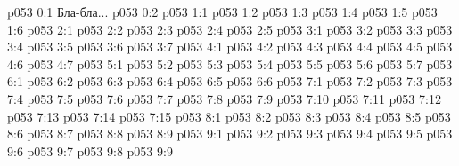 \author{Мановандет Мелхиседек}
\vs p053 0:1  Бла-бла...
\vs p053 0:2 
\vs p053 1:1 
\vs p053 1:2 
\vs p053 1:3 
\vs p053 1:4 
\vs p053 1:5 
\vs p053 1:6 \pc 
{}
\vs p053 2:1 
\vs p053 2:2 
\vs p053 2:3 \pc 
\vs p053 2:4 
\vs p053 2:5 
\vs p053 3:1 
\vs p053 3:2 
\vs p053 3:3 
\vs p053 3:4 
\vs p053 3:5 
\vs p053 3:6 
\vs p053 3:7 \pc 
{}
\vs p053 4:1 
\vs p053 4:2 
\vs p053 4:3 
\vs p053 4:4 \pc 
\vs p053 4:5 \pc 
\vs p053 4:6 
\vs p053 4:7 \pc 
{}
\vs p053 5:1 
\vs p053 5:2 \pc 
\vs p053 5:3 
\vs p053 5:4 \pc 
\vs p053 5:5 
\vs p053 5:6 
\vs p053 5:7 
\vs p053 6:1 
\vs p053 6:2 
\vs p053 6:3 \pc 
\vs p053 6:4 
\vs p053 6:5 
\vs p053 6:6 \pc 
{}
\vs p053 7:1 
\vs p053 7:2 
\vs p053 7:3 
\vs p053 7:4 
\vs p053 7:5 
\vs p053 7:6 
\vs p053 7:7 
\vs p053 7:8 
\vs p053 7:9 \pc 
\vs p053 7:10 \pc 
\vs p053 7:11 
\vs p053 7:12 
\vs p053 7:13 \pc 
\vs p053 7:14 \pc 
\vs p053 7:15 
\vs p053 8:1 
\vs p053 8:2 
\vs p053 8:3 \pc 
\vs p053 8:4 
\vs p053 8:5 
\vs p053 8:6 \pc 
\vs p053 8:7 \pc 
\vs p053 8:8 
\vs p053 8:9 
\vs p053 9:1 
\vs p053 9:2 \pc 
\vs p053 9:3 \pc 
\vs p053 9:4 
\vs p053 9:5 \pc 
\vs p053 9:6 
\vs p053 9:7 
\vs p053 9:8 
\vsetoff
\vs p053 9:9 
\quizlink
